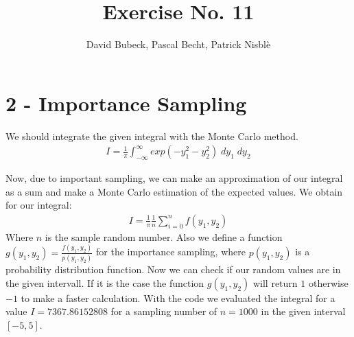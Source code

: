 \documentclass[11pt, a4paper, reqno]{scrartcl}
\begin{document}
    \title{Exercise No. 11}
    \author{David Bubeck, Pascal Becht, Patrick Nisbl\`e}
    \maketitle


    \section*{2 - Importance Sampling}
   
    	We should integrate the given integral with the Monte Carlo method.
    	\begin{align}
    		I = \frac{1}{\pi} \int_{-\infty}^{\infty} exp(-y_1^2 -y_2^2) \; dy_1 \; 			dy_2
    	\end{align}
    	
    	Now, due to important sampling, we can make an approximation of our 				integral as a sum and make a Monte Carlo estimation of the expected values. 		We obtain for our integral:
    	\begin{align*}
    		I = \frac{1}{\pi} \frac{1}{n} \sum_{i = 0}^{n} f(y_1, y_2)
    	\end{align*}
    	Where $n$ is the sample random number. \newline
    	Also we define a function $g(y_1, y_2) = \frac{f(y_1, y_2)}{p(y_1, y_2)}$ 			for the importance sampling, where $p(y_1, y_2)$ is a probability 					distribution function. Now we can check if our random values are in the 			given intervall. If it is the case the function $g(y_1, y_2)$ will return 			$1$ otherwise $-1$ to make a faster calculation. \newline
    	With the code we evaluated the integral for a value $I = 7367.86152808$ for 		a sampling number of $n = 1000$ in the given interval $[-5, 5]$.
     	
     	\begin{figure}[H]
     		
     	\end{figure}
      
		        
\end{document}
